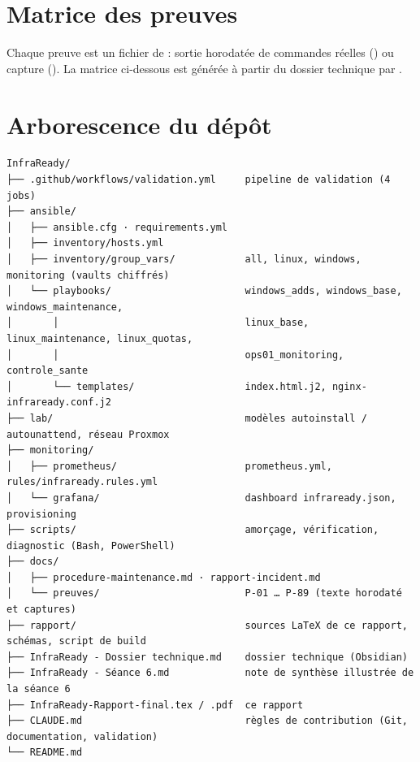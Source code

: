 
\chapter{Matrice des preuves}\label{annexe:preuves}

Chaque preuve est un fichier de  : sortie horodatée de commandes réelles
() ou capture (). La matrice ci-dessous est générée à partir du dossier
technique par .

{\small}

\chapter{Arborescence du dépôt}\label{annexe:arborescence}

\begin{footnotesize}
\begin{verbatim}
InfraReady/
├── .github/workflows/validation.yml     pipeline de validation (4 jobs)
├── ansible/
│   ├── ansible.cfg · requirements.yml
│   ├── inventory/hosts.yml
│   ├── inventory/group_vars/            all, linux, windows, monitoring (vaults chiffrés)
│   └── playbooks/                       windows_adds, windows_base, windows_maintenance,
│       │                                linux_base, linux_maintenance, linux_quotas,
│       │                                ops01_monitoring, controle_sante
│       └── templates/                   index.html.j2, nginx-infraready.conf.j2
├── lab/                                 modèles autoinstall / autounattend, réseau Proxmox
├── monitoring/
│   ├── prometheus/                      prometheus.yml, rules/infraready.rules.yml
│   └── grafana/                         dashboard infraready.json, provisioning
├── scripts/                             amorçage, vérification, diagnostic (Bash, PowerShell)
├── docs/
│   ├── procedure-maintenance.md · rapport-incident.md
│   └── preuves/                         P-01 … P-89 (texte horodaté et captures)
├── rapport/                             sources LaTeX de ce rapport, schémas, script de build
├── InfraReady - Dossier technique.md    dossier technique (Obsidian)
├── InfraReady - Séance 6.md             note de synthèse illustrée de la séance 6
├── InfraReady-Rapport-final.tex / .pdf  ce rapport
├── CLAUDE.md                            règles de contribution (Git, documentation, validation)
└── README.md
\end{verbatim}
\end{footnotesize}


